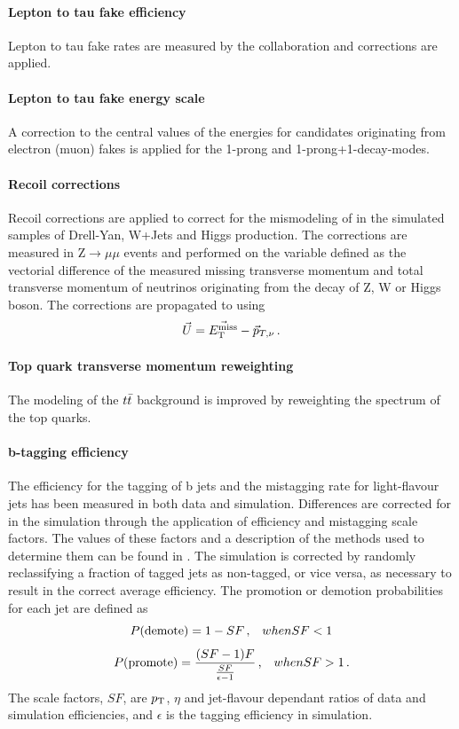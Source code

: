 \paragraph{Lepton to tau fake efficiency} Lepton to tau fake rates are measured by the collaboration and corrections are applied.

\paragraph{Lepton to tau fake energy scale} A correction to the central values of the \tauh energies for \tauh candidates originating from electron (muon) fakes is applied for the 1-prong and 1-prong+1-\pizero decay-modes. 

\paragraph{Recoil corrections} Recoil corrections are applied to correct for the mismodeling of \MET in the simulated samples of Drell-Yan, W+Jets and Higgs production. The corrections are measured in $\mathrm{Z} \rightarrow \mu\mu$ events and performed on the variable defined as the vectorial difference of the measured missing transverse momentum and total transverse momentum of neutrinos originating from the decay of Z, W or Higgs boson. The corrections are propagated to \MET using
\begin{equation}
    \Vec{U} = \Vec{\MET} - \Vec{p}_{T,\nu} \mend
\end{equation}

\paragraph{Top quark transverse momentum reweighting} The modeling of the $t\Bar{t}$ background is improved by reweighting the \pt spectrum of the top quarks.

\paragraph{b-tagging efficiency} The efficiency for the tagging of b jets and the mistagging rate for light-flavour jets has been measured in both data and simulation. Differences are corrected for in the simulation through the application of efficiency and mistagging scale factors. The values of these factors and a description of the methods used to determine them can be found in \cite{Sirunyan_2018}. The simulation is corrected by randomly reclassifying a fraction of tagged jets as non-tagged, or vice versa, as necessary to result in the correct average efficiency. The promotion or demotion probabilities for each jet are defined as
\begin{equation*}
    P(\mathrm{demote}) = 1 - SF \msep when SF < 1
\end{equation*}
\begin{equation*}
    P(\mathrm{promote}) = \frac{(SF-1)F}{\frac{SF}{\epsilon-1}} \msep when SF > 1 \mend
\end{equation*}
The scale factors, $SF$, are $p_{\mathrm{T}}$, $\eta$ and jet-flavour dependant ratios of data and simulation efficiencies, and $\epsilon$ is the tagging efficiency in simulation.

